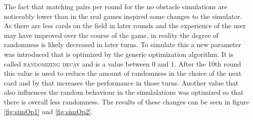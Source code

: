 The fact that matching pairs per round for the no obstacle simulations are noticeably lower than in the real games inspired some changes to the simulator. As there are less cards on the field in later rounds and the experience of the user may have improved over the course of the game, in reality the degree of randomness is likely decreased in later turns. To simulate this a new parameter was introduced that is optimized by the generic optimization algorithm. It is called \textsc{randomizing decay} and is a value between 0 and 1. After the 10th round this value is used to reduce the amount of randomness in the choice of the next card and by that increases the performance in those turns. Another value that also influences the random behaviour in the simulalations was optimized so that there is overall less randomness. The results of these changes can be seen in figure \ref{fig:simOp1} and \ref{fig:simOp2}. 


